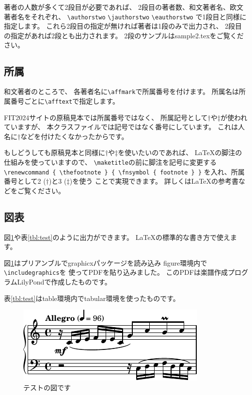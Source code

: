 \documentclass{FITpaper}
\begin{document}
著者の人数が多くて2段目が必要であれば、
2段目の著者数、和文著者名、欧文著者名をそれぞれ、
\texttt{\textbackslash authorstwo}
\texttt{\textbackslash jauthorstwo}
\texttt{\textbackslash eauthorstwo}
で1段目と同様に指定します。
これら2段目の指定が無ければ著者は1段のみで出力され、
2段目の指定があれば2段とも出力されます。
2段のサンプルはsample2.texをご覧ください。

\subsection{所属}

和文著者のところで、
各著者名に\texttt{\textbackslash af\mbox{}fmark}で所属番号を付けます。
所属名は所属番号ごとに\texttt{\textbackslash af\mbox{}ftext}で指定します。

FIT2024サイトの原稿見本では所属番号ではなく、
所属記号として$\dag$や$\ddag$が使われていますが、
本クラスファイルでは記号ではなく番号にしています。
これは人名に$\dag$などを付けたくなかったからです。

もしどうしても原稿見本と同様に$\dag$や$\ddag$を使いたいのであれば、
\LaTeX の脚注の仕組みを使っていますので、
\texttt{\textbackslash maketitle}の前に脚注を記号に変更する
\texttt{\textbackslash renewcommand \{
  \textbackslash thefootnote \} \{
  \textbackslash fnsymbol \{ footnote \} \}}
を入れ、所属番号として2 ($\dag$)と3 ($\ddag$)を使う
ことで実現できます。
詳しくは\LaTeX の参考書などをご覧ください。

\subsection{図表}

図\ref{fig:test}や表\ref{tbl:test}のように出力ができます。
\LaTeX の標準的な書き方で使えます。

図\ref{fig:test}はプリアンブルでgraphicxパッケージを読み込み
figure環境内で\texttt{\textbackslash includegraphics}を
使ってPDFを貼り込みました。
このPDFは楽譜作成プログラムLilyPond\cite{lilypond}で作成したものです。

表\ref{tbl:test}はtable環境内でtabular環境を使ったものです。

\begin{figure}[htbp]
  \centering
  \includegraphics{invention1}
  \caption{テストの図です}
  \label{fig:test}
\end{figure}
\end{document}
